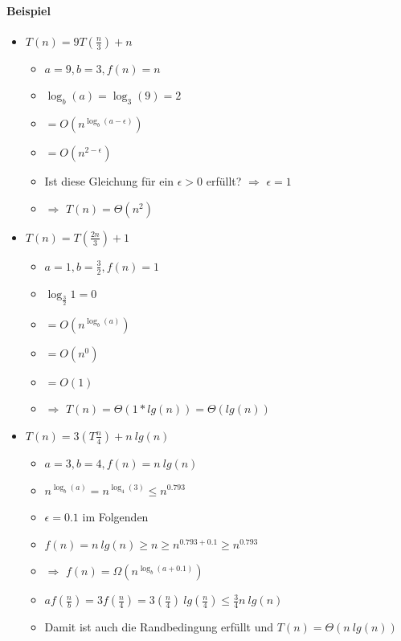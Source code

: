 \documentclass[
    ngerman,
    color=3b,
    dark_mode,
    load_common, %
    summary,
    boxarc,
]{rubos-tuda-template}
\begin{document}
\paragraph{Beispiel}\mbox{}
\begin{itemize}
    \item \textit{$T(n) = 9T(\frac{n}{3}) + n$}
          \begin{itemize}
              \item $a=9, b=3, f(n)=n$
              \item $\log_b(a) = \log_3(9) = 2$
              \item {} $= O(n^{\log_b(a-\epsilon)})$
              \item[] {\makebox[1.5cm][l]{}} $= O(n^{2-\epsilon})$
              \item Ist diese Gleichung für ein $\epsilon > 0$ erfüllt? $\Rightarrow$ $\epsilon = 1$
              \item {} $\Rightarrow$ $T(n) = \Theta(n^2)$
          \end{itemize}

    \item \textit{$T(n) = T(\frac{2n}{3}) + 1$}
          \begin{itemize}
              \item $a=1, b= \frac{3}{2}, f(n) = 1$
              \item $\log_{\frac{3}{2}} 1 = 0$
              \item {} $= O(n^{\log_b(a)})$
              \item[] {\makebox[1.5cm][l]{}} $= O(n^0)$
              \item[] {\makebox[1.5cm][l]{}} $= O(1)$
              \item {} $\Rightarrow$ $T(n) = \Theta(1 * lg(n)) = \Theta(lg(n))$
          \end{itemize}

    \item \textit{$T(n) = 3(T\frac{n}{4}) + n~lg(n)$}
          \begin{itemize}
              \item $a=3,b=4,f(n)= n~lg(n)$
              \item $n^{\log_b(a)} = n^{\log_4(3)} \leq n^{0.793}$
              \item $\epsilon = 0.1$ im Folgenden
              \item $f(n) = n~lg(n) \geq n \geq n^{0.793 + 0.1} \geq n^{0.793}$
              \item {} $\Rightarrow$ $f(n) = \Omega(n^{\log_b(a+0.1)})$
              \item $a f(\frac{n}{b}) = 3f(\frac{n}{4}) = 3(\frac{n}{4})~lg(\frac{n}{4}) \leq \frac{3}{4} n~lg(n)$
              \item Damit ist auch die Randbedingung erfüllt und $T(n) = \Theta(n~lg(n))$

          \end{itemize}
\end{itemize}
\end{document}
